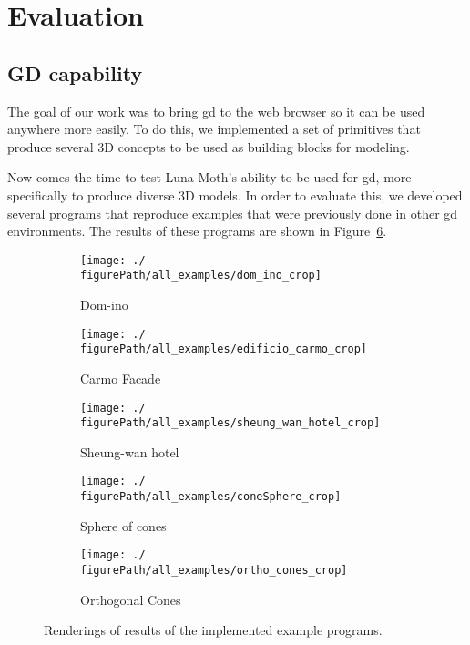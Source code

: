 
\section{Evaluation}
\label{sec:evaluation}


\subsection{GD capability}
The goal of our work was to bring \gls{gd} to the web browser so it can be used anywhere more easily.
To do this, we implemented a set of primitives that produce several 3D concepts to be used as building blocks for modeling.

Now comes the time to test Luna Moth's ability to be used for \gls{gd}, more specifically to produce diverse 3D models.
In order to evaluate this, we developed several programs that reproduce examples that were previously done in other \gls{gd} environments.
The results of these programs are shown in Figure~\ref{fig:all:examples}.

\begin{figure}
  \centering
  \begin{subfigure}[t]{0.3\linewidth}
    \texttt{[image: ./\\figurePath/all\_examples/dom\_ino\_crop]}
    \caption{Dom-ino}
    \label{fig:ex:domino}
  \end{subfigure}
  \begin{subfigure}[t]{0.3\linewidth}
    \texttt{[image: ./\\figurePath/all\_examples/edificio\_carmo\_crop]}
    \caption{Carmo Facade}
    \label{fig:ex:carmo:facade}
  \end{subfigure}
  \begin{subfigure}[t]{0.3\linewidth}
    \texttt{[image: ./\\figurePath/all\_examples/sheung\_wan\_hotel\_crop]}
    \caption{Sheung-wan hotel}
    \label{fig:ex:sheung:wan}
  \end{subfigure}
  \begin{subfigure}[t]{0.3\linewidth}
    \texttt{[image: ./\\figurePath/all\_examples/coneSphere\_crop]}
    \caption{Sphere of cones}
    \label{fig:ex:cone:sphere}
  \end{subfigure}
  \begin{subfigure}[t]{0.3\linewidth}
    \texttt{[image: ./\\figurePath/all\_examples/ortho\_cones\_crop]}
    \caption{Orthogonal Cones}
    \label{fig:ex:ortho:cones}
  \end{subfigure}

  \caption{Renderings of results of the implemented example programs.}
  \label{fig:all:examples}
\end{figure}

